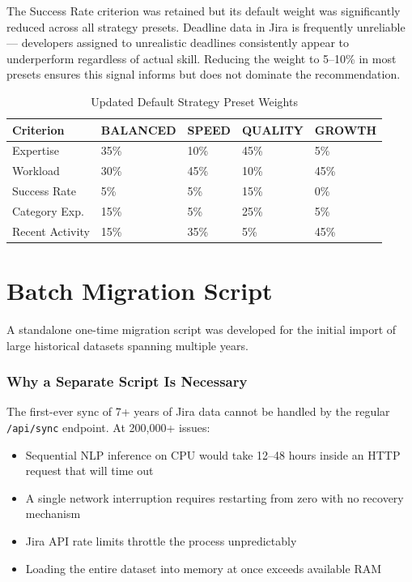 \documentclass[12pt, a4paper]{article}
\begin{document}
The Success Rate criterion was retained but its default weight was significantly reduced across all strategy presets. Deadline data in Jira is frequently unreliable — developers assigned to unrealistic deadlines consistently appear to underperform regardless of actual skill. Reducing the weight to 5--10\% in most presets ensures this signal informs but does not dominate the recommendation.

\begin{table}[H]
\centering
\caption{Updated Default Strategy Preset Weights}
\begin{tabularx}{\textwidth}{|l|X|X|X|X|}
\hline
\textbf{Criterion} & \textbf{BALANCED} & \textbf{SPEED} & \textbf{QUALITY} & \textbf{GROWTH} \\
\hline
Expertise        & 35\% & 10\% & 45\% & 5\%  \\
Workload         & 30\% & 45\% & 10\% & 45\% \\
Success Rate     & 5\%  & 5\%  & 15\% & 0\%  \\
Category Exp.    & 15\% & 5\%  & 25\% & 5\%  \\
Recent Activity  & 15\% & 35\% & 5\%  & 45\% \\
\hline
\end{tabularx}
\end{table}


\section{Batch Migration Script}

A standalone one-time migration script was developed for the initial import of large historical datasets spanning multiple years.

\subsubsection{Why a Separate Script Is Necessary}

The first-ever sync of 7+ years of Jira data cannot be handled by the regular \texttt{/api/sync} endpoint. At 200{,}000+ issues:

\begin{itemize}
    \item Sequential NLP inference on CPU would take 12--48 hours inside an HTTP request that will time out
    \item A single network interruption requires restarting from zero with no recovery mechanism
    \item Jira API rate limits throttle the process unpredictably
    \item Loading the entire dataset into memory at once exceeds available RAM
\end{itemize}
\end{document}
